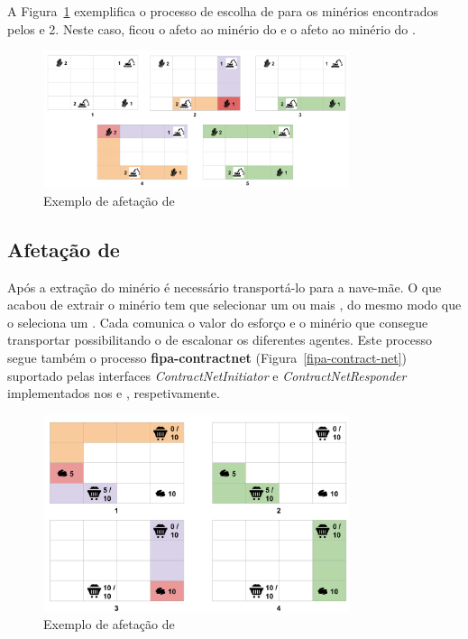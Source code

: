 \documentclass[12pt]{report}
\begin{document}
\FloatBarrier
A Figura~\ref{producer-scheduling} exemplifica o processo de escolha de \producers para os minérios encontrados pelos  e 2. 
Neste caso, ficou o  afeto ao minério do  e o  afeto ao minério do .

\begin{figure}[h]
	\centering
    \includegraphics[width=0.8\textwidth]{producer-scheduling}
	\caption{Exemplo de afetação de \producers}
	\label{producer-scheduling}
\end{figure}

\FloatBarrier
\subsection{Afetação de \transporters}
Após a extração do minério é necessário transportá-lo para a nave-mãe. O \producer que acabou de extrair o minério tem que selecionar um ou mais \transporters, do mesmo modo que o \spotter seleciona um \producer. 
Cada \transporter comunica o valor do esforço e o minério que consegue transportar possibilitando o \producer de escalonar os diferentes agentes.
Este processo segue também o processo \textbf{fipa-contractnet} (Figura~\ref{fipa-contract-net}) suportado pelas interfaces \emph{ContractNetInitiator} e \emph{ContractNetResponder} implementados nos \producers e \transporters, respetivamente.

\begin{figure}[h]
	\centering
    \includegraphics[width=0.8\textwidth]{transporter-scheduling}
	\caption{Exemplo de afetação de \transporters}
	\label{transporter-scheduling}
\end{figure}
\end{document}
